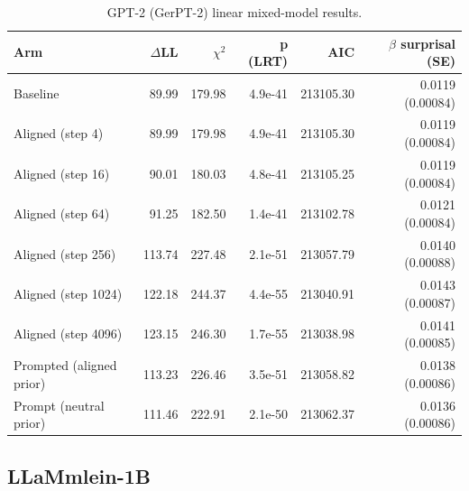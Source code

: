 \documentclass[10pt,letterpaper]{article}
\begin{document}
\begin{table}[t]
  \begin{center}
    \caption{GPT-2 (GerPT-2) linear mixed-model results.}
    \label{tab:gpt-results}
    \vskip 0.12in
    \small
    \begin{tabular}{lrrrrr}
      \hline
      Arm & $\Delta$LL & $\chi^2$ & p (LRT) & AIC & $\beta$ surprisal (SE) \\
      \hline
      Baseline & 89.99 & 179.98 & 4.9e-41 & 213105.30 & 0.0119 (0.00084) \\
      Aligned (step 4) & 89.99 & 179.98 & 4.9e-41 & 213105.30 & 0.0119 (0.00084) \\
      Aligned (step 16) & 90.01 & 180.03 & 4.8e-41 & 213105.25 & 0.0119 (0.00084) \\
      Aligned (step 64) & 91.25 & 182.50 & 1.4e-41 & 213102.78 & 0.0121 (0.00084) \\
      Aligned (step 256) & 113.74 & 227.48 & 2.1e-51 & 213057.79 & 0.0140 (0.00088) \\
      Aligned (step 1024) & 122.18 & 244.37 & 4.4e-55 & 213040.91 & 0.0143 (0.00087) \\
      Aligned (step 4096) & 123.15 & 246.30 & 1.7e-55 & 213038.98 & 0.0141 (0.00085) \\
      Prompted (aligned prior) & 113.23 & 226.46 & 3.5e-51 & 213058.82 & 0.0138 (0.00086) \\
      Prompt (neutral prior) & 111.46 & 222.91 & 2.1e-50 & 213062.37 & 0.0136 (0.00086) \\
      \hline
    \end{tabular}
  \end{center}
\end{table}

\subsection{LLaMmlein-1B}
\end{document}
